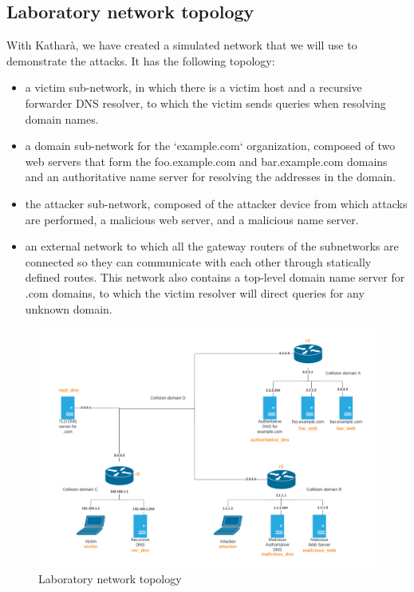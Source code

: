 \documentclass[11pt,a4paper]{article}
\begin{document}
\subsection{Laboratory network topology}

With Katharà, we have created a simulated network that we will use to demonstrate the attacks.
It has the following topology:
\begin{itemize}
\item a victim sub-network, in which there is a victim host and a recursive forwarder DNS
resolver, to which the victim sends queries when resolving domain names.
\item a domain sub-network for the ‘example.com‘ organization, composed of two web
servers that form the foo.example.com and bar.example.com domains and an authoritative
name server for resolving the addresses in the domain.
\item the attacker sub-network, composed of the attacker device from which attacks are
performed, a malicious web server, and a malicious name server.
\item an external network to which all the gateway routers of the subnetworks are connected so
they can communicate with each other through statically defined routes. This network also
contains a top-level domain name server for .com domains, to which the victim resolver
will direct queries for any unknown domain.
\end{itemize}

\begin{figure}[h!]
  \centering
  \includegraphics[width=\textwidth]{network-topology.png}
  \caption{Laboratory network topology}
\end{figure}
\end{document}
